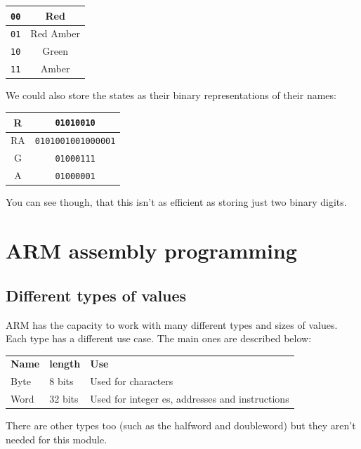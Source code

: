 \begin{center}
	\begin{tabular}{|c|c|}
		\hline
		{\tt 00} & Red\\ \hline
		{\tt 01} & Red Amber\\ \hline
		{\tt 10} & Green\\ \hline
		{\tt 11} & Amber\\ \hline
	\end{tabular}
\end{center}

We could also store the states as their binary representations of their names:

\begin{center}
	\begin{tabular}{|c|c|}
		\hline
		R & {\tt 01010010}\\ \hline
		RA & {\tt 0101001001000001}\\ \hline
		G & {\tt 01000111}\\ \hline
		A & {\tt 01000001}\\ \hline
	\end{tabular}
\end{center}

You can see though, that this isn't as efficient as storing just two binary
digits.

\section{ARM assembly programming}

\subsection{Different types of values}

ARM has the capacity to work with many different types and sizes of values. Each type has a different use case. The main ones are described below:

\begin{tabularx}{\textwidth}{l l X}
	{\bf Name} & {\bf length} & {\bf Use}\\
	Byte & 8 bits & Used for characters\\
	Word & 32 bits & Used for integer es, addresses and instructions\\
\end{tabularx}

There are other types too (such as the halfword and doubleword) but they aren't needed for this module.

